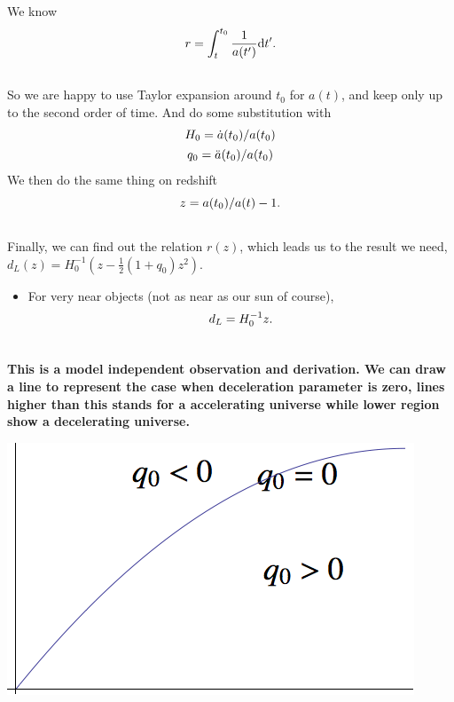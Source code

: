 \documentclass[letterpaper,10pt,english]{sphinxmanual}
\begin{document}
{We know
\begin{gather}
\begin{split}r = \int_t^{t_0} \frac{1}{a(t')} \mathrm d t' .\end{split}\notag\\\begin{split}\end{split}\notag
\end{gather}
So we are happy to use Taylor expansion around $t_0$ for $a(t)$, and keep only up to the second order of time. And do some substitution with
\begin{gather}
\begin{split}H_0 = \dot a(t_0)/a(t_0)\end{split}\notag\\\begin{split}q_0=\ddot a (t_0) / a(t_0)\end{split}\notag
\end{gather}
We then do the same thing on redshift
\begin{gather}
\begin{split}z=a(t_0)/a(t) - 1 .\end{split}\notag\\\begin{split}\end{split}\notag
\end{gather}
Finally, we can find out the relation $r(z)$, which leads us to the result we need, $d_L(z) = H_0^{-1} (z - \frac12 (1+q_0) z^2)$.
\begin{itemize}
\item {} 
For very near objects (not as near as our sun of course),
\begin{gather}
\begin{split}d_L = H_0^{-1}z .\end{split}\notag\\\begin{split}\end{split}\notag
\end{gather}
\end{itemize}

\textbf{This is a model independent observation and derivation. We can draw a line to represent the case when deceleration parameter is zero, lines higher than this stands for a accelerating universe while lower region show a decelerating universe.}

\includegraphics{LuminosityDistanceVSRedshift.png}

}
\end{document}
